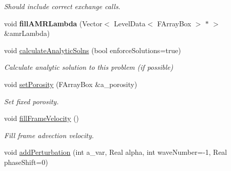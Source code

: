 \begin{DoxyCompactItemize}
\begin{DoxyCompactList}\small\item\em Should include correct exchange calls. \end{DoxyCompactList}\item 
\hypertarget{class_a_m_r_level_mushy_layer_afafb4a5c5aa7d19d6f817d70d922ed37}{void {\bfseries fill\-A\-M\-R\-Lambda} (Vector$<$ Level\-Data$<$ F\-Array\-Box $>$ $\ast$ $>$ \&amr\-Lambda)}\label{class_a_m_r_level_mushy_layer_afafb4a5c5aa7d19d6f817d70d922ed37}

\item 
\hypertarget{class_a_m_r_level_mushy_layer_a7aef043fd3a6055c2240b297c0c62de1}{void \hyperlink{class_a_m_r_level_mushy_layer_a7aef043fd3a6055c2240b297c0c62de1}{calculate\-Analytic\-Solns} (bool enforce\-Solutions=true)}\label{class_a_m_r_level_mushy_layer_a7aef043fd3a6055c2240b297c0c62de1}

\begin{DoxyCompactList}\small\item\em Calculate analytic solution to this problem (if possible) \end{DoxyCompactList}\item 
\hypertarget{class_a_m_r_level_mushy_layer_a649d148960a286ead48d991f696ef945}{void \hyperlink{class_a_m_r_level_mushy_layer_a649d148960a286ead48d991f696ef945}{set\-Porosity} (F\-Array\-Box \&a\-\_\-porosity)}\label{class_a_m_r_level_mushy_layer_a649d148960a286ead48d991f696ef945}

\begin{DoxyCompactList}\small\item\em Set fixed porosity. \end{DoxyCompactList}\item 
\hypertarget{class_a_m_r_level_mushy_layer_aec845e1d2322bb91f229e21fe9131362}{void \hyperlink{class_a_m_r_level_mushy_layer_aec845e1d2322bb91f229e21fe9131362}{fill\-Frame\-Velocity} ()}\label{class_a_m_r_level_mushy_layer_aec845e1d2322bb91f229e21fe9131362}

\begin{DoxyCompactList}\small\item\em Fill frame advection velocity. \end{DoxyCompactList}\item 
\hypertarget{class_a_m_r_level_mushy_layer_a78e4a88f5513ac4af2b60516f429d148}{void \hyperlink{class_a_m_r_level_mushy_layer_a78e4a88f5513ac4af2b60516f429d148}{add\-Perturbation} (int a\-\_\-var, Real alpha, int wave\-Number=-\/1, Real phase\-Shift=0)}\label{class_a_m_r_level_mushy_layer_a78e4a88f5513ac4af2b60516f429d148}


\end{DoxyCompactItemize}
